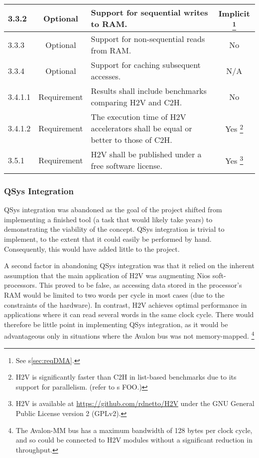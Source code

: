 \documentclass[english,onecolumn]{scrartcl}
\begin{document}
\begin{tabularx}{\textwidth}{l c X c}
3.3.2   & Optional    & Support for sequential writes to RAM. & Implicit%
\footnote{See s\ref{sec:reqDMA}.}
\\ \midrule

3.3.3   & Optional    & Support for non-sequential reads from RAM. & No
\\ \midrule

3.3.4   & Optional    & Support for caching subsequent accesses. & N/A
\\ \midrule

3.4.1.1 & Requirement & Results shall include benchmarks comparing H2V and C2H. & No
\\ \midrule

3.4.1.2 & Requirement & The execution time of H2V accelerators shall be equal or better to those of C2H. & Yes%
\footnote{H2V is significantly faster than C2H in list-based benchmarks due to its support for parallelism. (refer to s FOO.)}
\\ \midrule

3.5.1   & Requirement & H2V shall be published under a free software license. & Yes%
\footnote{H2V is available at \url{https://github.com/rdnetto/H2V} under the GNU General Public License version 2 (GPLv2).}
\\ \bottomrule
\end{tabularx}


\subsubsection{QSys Integration}
\label{sec:reqQsys}
QSys integration was abandoned as the goal of the project shifted from implementing a finished tool (a task that would likely take
years) to demonstrating the viability of the concept. QSys integration is trivial to implement, to the extent that it could easily
be performed by hand. Consequently, this would have added little to the project.

A second factor in abandoning QSys integration was that it relied on the inherent assumption that the main application of H2V was
augmenting Nios soft-processors. This proved to be false, as accessing data stored in the processor's RAM would be limited to two
words per cycle in most cases (due to the constraints of the hardware). In contrast, H2V achieves optimal performance in
applications where it can read several words in the same clock cycle. There would therefore be little point in implementing QSys
integration, as it would be advantageous only in situations where the Avalon bus was not memory-mapped.%
\footnote{The Avalon-MM bus has a maximum bandwidth of 128 bytes per clock cycle,\cite[3-4]{C2H_AvalonSpec} and so could be connected
    to H2V modules without a significant reduction in throughput.}
\end{document}
